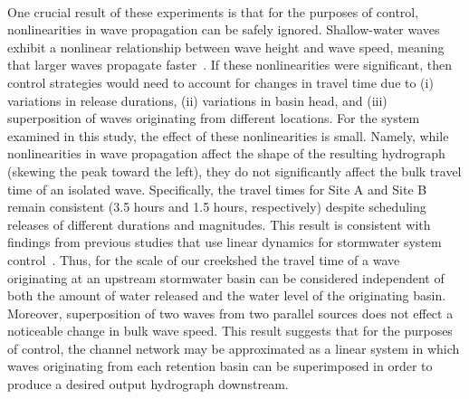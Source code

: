 \

One crucial result of these experiments is that for the purposes of control, nonlinearities in wave propagation can be safely ignored. Shallow-water waves exhibit a nonlinear relationship between wave height and wave speed, meaning that larger waves propagate faster~\cite{kinnmark2012shallow}. %
If these nonlinearities were significant, then control strategies would need to account for changes in travel time due to (i) variations in release durations, (ii) variations in basin head, and (iii) superposition of waves originating from different locations.
For the system examined in this study, the effect of these nonlinearities is small. Namely, while nonlinearities in wave propagation affect the shape of the resulting hydrograph (skewing the peak toward the left), they do not significantly affect the bulk travel time of an isolated wave.
Specifically, the travel times for Site A and Site B remain consistent (3.5 hours and 1.5 hours, respectively) despite scheduling releases of different durations and magnitudes. This result is consistent with findings from previous studies that use linear dynamics for stormwater system control~\cite{Litrico_2004, Marinaki_2003, Ocampo-Martinez_2015}.
Thus, for the scale of our creekshed the travel time of a wave originating at an upstream stormwater basin can be considered independent of both the amount of water released and the water level of the originating basin. Moreover, superposition of two waves from two parallel sources does not effect a noticeable change in bulk wave speed. This result suggests that for the purposes of control, the channel network may be approximated as a linear system in which waves originating from each retention basin can be superimposed in order to produce a desired output hydrograph downstream. 


